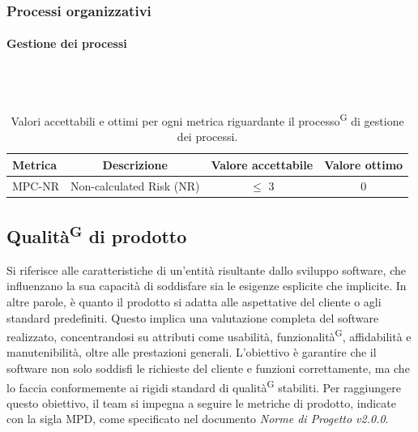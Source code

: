 \documentclass[8pt]{article}
\newcommand{\glossterm}[1]{#1\textsuperscript{G}} %
\newcommand{\subsubsubsection}[1]{\paragraph{#1}\mbox{}\\\\}
\begin{document}
\subsubsection{Processi organizzativi}
\subsubsubsection{Gestione dei processi}
\begin{table}[H]	
	\centering
	\begin{tabular}{lccc}
		\toprule
		\textbf{Metrica}& \textbf{Descrizione} & \textbf{Valore accettabile} & \textbf{Valore ottimo} \\
		\midrule
		MPC-NR & Non-calculated Risk (NR) & $\leq$ 3 & 0\\
		\bottomrule
	\end{tabular}
	\caption{Valori accettabili e ottimi per ogni metrica riguardante il \glossterm{processo} di gestione dei processi.}
	\label{table:Valori accettabili e ottimi per ogni metrica riguardante il processo di gestione dei processi.}
\end{table}
\subsection{\glossterm{Qualità} di prodotto}
Si riferisce alle caratteristiche di un'entità risultante dallo sviluppo software, che influenzano la sua capacità di soddisfare sia le esigenze esplicite che implicite. In altre parole, è quanto il prodotto si adatta alle aspettative del cliente o agli standard predefiniti. Questo implica una valutazione completa del software realizzato, concentrandosi su attributi come usabilità, \glossterm{funzionalità}, affidabilità e manutenibilità, oltre alle prestazioni generali. L'obiettivo è garantire che il software non solo soddisfi le richieste del cliente e funzioni correttamente, ma che lo faccia conformemente ai rigidi standard di \glossterm{qualità} stabiliti. Per raggiungere questo obiettivo, il team si impegna a seguire le metriche di prodotto, indicate con la sigla MPD, come specificato nel documento \textit{Norme di Progetto v2.0.0}.
\end{document}
